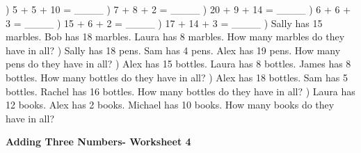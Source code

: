 \documentclass{article}%
\begin{document}
) 5 + 5 + 10 = \_\_\_\_%
\newline%
\newline%
) 7 + 8 + 2 = \_\_\_\_%
\newline%
\newline%
) 20 + 9 + 14 = \_\_\_\_%
\newline%
\newline%
) 6 + 6 + 3 = \_\_\_\_%
\newline%
\newline%
) 15 + 6 + 2 = \_\_\_\_%
\newline%
\newline%
) 17 + 14 + 3 = \_\_\_\_%
\newline%
\newline%
) Sally has 15 marbles. Bob has 18 marbles. Laura has 8 marbles. How many marbles do they have in all?%
\newline%
\newline%
) Sally has 18 pens. Sam has 4 pens. Alex has 19 pens. How many pens do they have in all?%
\newline%
\newline%
) Alex has 15 bottles. Laura has 8 bottles. James has 8 bottles. How many bottles do they have in all?%
\newline%
\newline%
) Alex has 18 bottles. Sam has 5 bottles. Rachel has 16 bottles. How many bottles do they have in all?%
\newline%
\newline%
) Laura has 12 books. Alex has 2 books. Michael has 10 books. How many books do they have in all?%
\newline%
\newline%
\newline%
\pagebreak%
\large%
\begin{center}%
\textbf{Adding Three Numbers- Worksheet 4}%
\newline%
\newline%
\newline%
\end{center} \normalsize%
\end{document}
